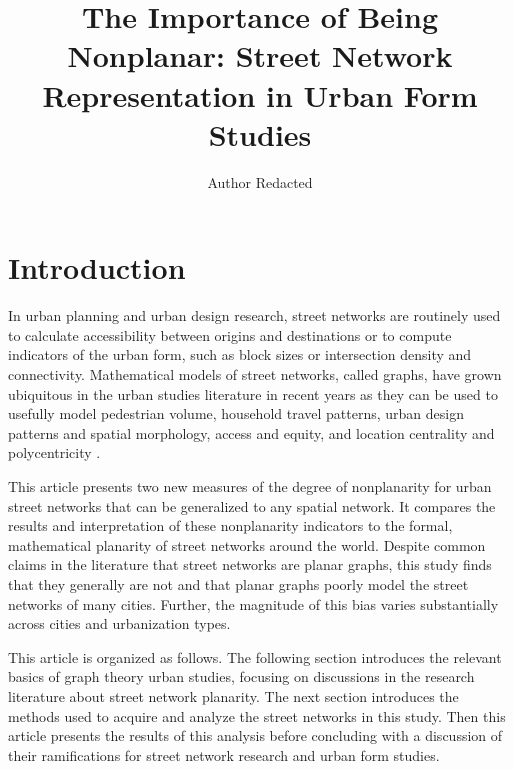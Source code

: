 \documentclass[Afour,sageh,times]{sagej}
\begin{document}
\title{The Importance of Being Nonplanar: Street Network Representation in Urban Form Studies}
\author{Author Redacted }


\begin{abstract}

\end{abstract}


\maketitle

\section{Introduction}

In urban planning and urban design research, street networks are routinely used to calculate accessibility between origins and destinations or to compute indicators of the urban form, such as block sizes or intersection density and connectivity. Mathematical models of street networks, called graphs, have grown ubiquitous in the urban studies literature in recent years as they can be used to usefully model pedestrian volume, household travel patterns, urban design patterns and spatial morphology, access and equity, and location centrality and polycentricity \citep{marshall_street_2010,porta_alterations_2014,marshall_community_2014,hajrasouliha_impact_2015,parthasarathi_street_2015,knight_metrics_2015,gil_street_2016,zhong_revealing_2017}.

This article presents two new measures of the degree of nonplanarity for urban street networks that can be generalized to any spatial network. It compares the results and interpretation of these nonplanarity indicators to the formal, mathematical planarity of street networks around the world. Despite common claims in the literature that street networks are planar graphs, this study finds that they generally are not and that planar graphs poorly model the street networks of many cities. Further, the magnitude of this bias varies substantially across cities and urbanization types.

This article is organized as follows. The following section introduces the relevant basics of graph theory urban studies, focusing on discussions in the research literature about street network planarity. The next section introduces the methods used to acquire and analyze the street networks in this study. Then this article presents the results of this analysis before concluding with a discussion of their ramifications for street network research and urban form studies.
\end{document}
